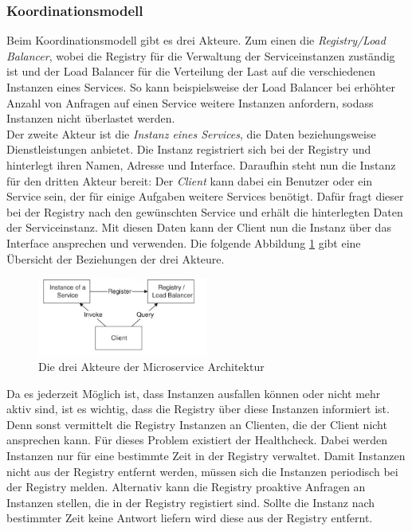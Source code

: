 \subsubsection{Koordinationsmodell}

Beim Koordinationsmodell gibt es drei Akteure. Zum einen die \textit{Registry/Load Balancer}, wobei die Registry für die Verwaltung der Serviceinstanzen zuständig ist und der Load Balancer für die Verteilung der Last auf die verschiedenen Instanzen eines Services. So kann beispielsweise der Load Balancer bei erhöhter Anzahl von Anfragen auf einen Service weitere Instanzen anfordern, sodass Instanzen nicht überlastet werden.\\
Der zweite Akteur ist die \textit{Instanz eines Services}, die Daten beziehungsweise Dienstleistungen anbietet. Die Instanz registriert sich bei der Registry und hinterlegt ihren Namen, Adresse und Interface. Daraufhin steht nun die Instanz für den dritten Akteur bereit: Der \textit{Client} kann dabei ein Benutzer oder ein Service sein, der für einige Aufgaben weitere Services benötigt. Dafür fragt dieser bei der Registry nach den gewünschten Service und erhält die hinterlegten Daten der Serviceinstanz. Mit diesen Daten kann der Client nun die Instanz über das Interface ansprechen und verwenden. Die folgende Abbildung \ref{bService} gibt eine Übersicht der Beziehungen der drei Akteure.

\begin{figure}[htbp]
  \centering
  \includegraphics[width=0.5\textwidth]{pictures/3akteure.png}
	\caption{Die drei Akteure der Microservice Architektur}
	\label{bService}
\end{figure}

Da es jederzeit Möglich ist, dass Instanzen ausfallen können oder nicht mehr aktiv sind, ist es wichtig, dass die Registry über diese Instanzen informiert ist. Denn sonst vermittelt die Registry Instanzen an Clienten, die der Client nicht ansprechen kann. Für dieses Problem existiert der Healthcheck. Dabei werden Instanzen nur für eine bestimmte Zeit in der Registry verwaltet. Damit Instanzen nicht aus der Registry entfernt werden, müssen sich die Instanzen periodisch bei der Registry melden. Alternativ kann die Registry proaktive Anfragen an Instanzen stellen, die in der Registry registiert sind. Sollte die Instanz nach bestimmter Zeit keine Antwort liefern wird diese aus der Registry entfernt.

